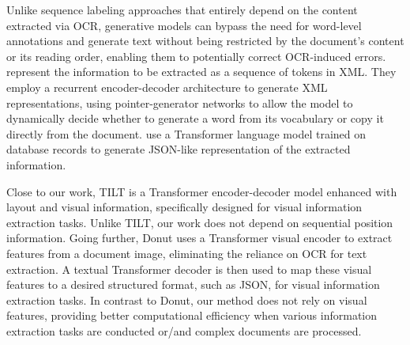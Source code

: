 Unlike sequence labeling approaches that entirely depend on the content extracted via \ac{OCR}, generative models can bypass the need for word-level annotations and generate text without being restricted by the document's content or its reading order, enabling them to potentially correct \ac{OCR}-induced errors. \citet{sage2020end} represent the information to be extracted as a sequence of tokens in XML. They employ a recurrent encoder-decoder architecture to generate XML representations, using pointer-generator networks \citep{see2017get} to allow the model to dynamically decide whether to generate a word from its vocabulary or copy it directly from the document. \citet{townsend2021doc2dict} use a Transformer \citep{vaswani2017attention} language model trained on database records to generate JSON-like representation of the extracted information. 

Close to our work, TILT \citep{powalski2021going} is a Transformer encoder-decoder model enhanced with layout and visual information, specifically designed for visual information extraction tasks. Unlike TILT, our work does not depend on sequential position information. Going further, Donut \citep{kim2022ocr} uses a Transformer visual encoder to extract features from a document image, eliminating the reliance on \ac{OCR} for text extraction. A textual Transformer decoder is then used to map these visual features to a desired structured format, such as JSON, for visual information extraction tasks. In contrast to Donut, our method does not rely on visual features, providing better computational efficiency when various information extraction tasks are conducted or/and complex documents are processed. \\


